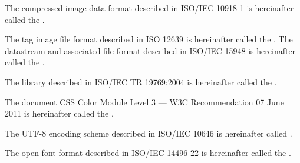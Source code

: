 \pnum
The compressed image data format described in ISO/IEC 10918-1 is hereinafter called the .

\pnum
The tag image file format described in ISO 12639 is hereinafter called the .
\pnum
The datastream and associated file format described in ISO/IEC 15948 is hereinafter called the .

\pnum
The library described in ISO/IEC TR 19769:2004 is hereinafter called the
.

\pnum
The document CSS Color Module Level 3 --- W3C Recommendation 07 June 2011 is 
hereinafter called the .

\pnum
The UTF-8 encoding scheme described in ISO/IEC 10646 is hereinafter called .

\pnum
The open font format described in ISO/IEC 14496-22 is hereinafter called the .